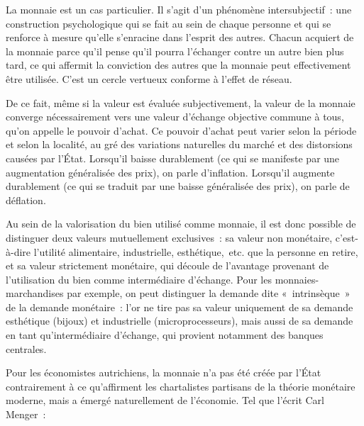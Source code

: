 La monnaie est un cas particulier. Il s'agit d'un phénomène intersubjectif~: une construction psychologique qui se fait au sein de chaque personne et qui se renforce à mesure qu'elle s'enracine dans l'esprit des autres. Chacun acquiert de la monnaie parce qu'il pense qu'il pourra l'échanger contre un autre bien plus tard, ce qui affermit la conviction des autres que la monnaie peut effectivement être utilisée. C'est un cercle vertueux conforme à l'effet de réseau.

De ce fait, même si la valeur est évaluée subjectivement, la valeur de la monnaie converge nécessairement vers une valeur d'échange objective commune à tous, qu'on appelle le pouvoir d'achat. Ce pouvoir d'achat peut varier selon la période et selon la localité, au gré des variations naturelles du marché et des distorsions causées par l'État. Lorsqu'il baisse durablement (ce qui se manifeste par une augmentation généralisée des prix), on parle d'inflation. Lorsqu'il augmente durablement (ce qui se traduit par une baisse généralisée des prix), on parle de déflation.

Au sein de la valorisation du bien utilisé comme monnaie, il est donc possible de distinguer deux valeurs mutuellement exclusives~: sa valeur non monétaire, c'est-à-dire l'utilité alimentaire, industrielle, esthétique,~etc. que la personne en retire, et sa valeur strictement monétaire, qui découle de l'avantage provenant de l'utilisation du bien comme intermédiaire d'échange. Pour les monnaies-marchandises par exemple, on peut distinguer la demande dite «~intrinsèque~» de la demande monétaire~: l'or ne tire pas sa valeur uniquement de sa demande esthétique (bijoux) et industrielle (microprocesseurs), mais aussi de sa demande en tant qu'intermédiaire d'échange, qui provient notamment des banques centrales.


Pour les économistes autrichiens, la monnaie n'a pas été créée par l'État contrairement à ce qu'affirment les chartalistes partisans de la théorie monétaire moderne, mais a émergé naturellement de l'économie. Tel que l'écrit Carl Menger~:

